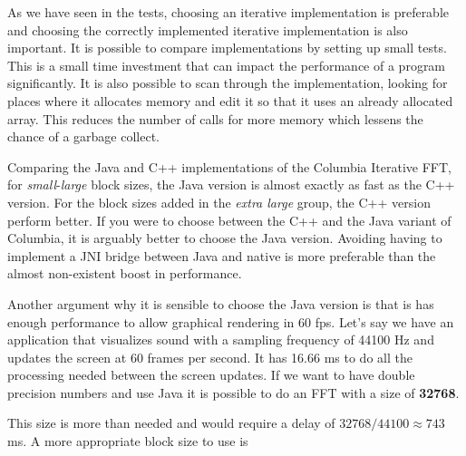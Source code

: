 As we have seen in the tests, choosing an iterative implementation is preferable and choosing the correctly implemented iterative implementation is also important. It is possible to compare implementations by setting up small tests. This is a small time investment that can impact the performance of a program significantly. It is also possible to scan through the implementation, looking for places where it allocates memory and edit it so that it uses an already allocated array. This reduces the number of calls for more memory which lessens the chance of a garbage collect.



Comparing the Java and C++ implementations of the Columbia Iterative FFT, for \emph{small}-\emph{large} block sizes, the Java version is almost exactly as fast as the C++ version. For the block sizes added in the \emph{extra large} group, the C++ version perform better. If you were to choose between the C++ and the Java variant of Columbia, it is arguably better to choose the Java version. Avoiding having to implement a JNI bridge between Java and native is more preferable than the almost non-existent boost in performance.

Another argument why it is sensible to choose the Java version is that is has enough performance to allow graphical rendering in 60 \gls{fps}. Let's say we have an application that visualizes sound with a sampling frequency of 44100 Hz and updates the screen at 60 frames per second. It has 16.66 ms to do all the processing needed between the screen updates. If we want to have double precision numbers and use Java it is possible to do an FFT with a size of \textbf{32768}.

This size is more than needed and would require a delay of $32768/44100\approx 743 $ ms. A more appropriate block size to use is 


